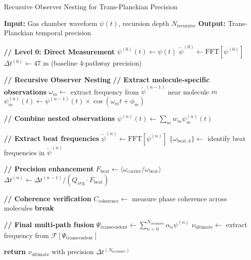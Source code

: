 \documentclass[12pt,a4paper]{article}
\begin{document}
\begin{algorithm}[H]
\caption{Recursive Observer Nesting for Trans-Planckian Precision}
\begin{algorithmic}[1]
\State \textbf{Input:} Gas chamber waveform $\psi(t)$, recursion depth $N_{\text{recursive}}$
\State \textbf{Output:} Trans-Planckian temporal precision

\State \textbf{// Level 0: Direct Measurement}
\State $\psi^{(0)}(t) \gets \psi(t)$
\State $\tilde{\psi}^{(0)} \gets \text{FFT}[\psi^{(0)}]$
\State $\Delta t^{(0)} \gets 47$ zs (baseline 4-pathway precision)

\State \textbf{// Recursive Observer Nesting}
    \State \textbf{// Extract molecule-specific observations}
        \State $\omega_m \gets$ extract frequency from $\tilde{\psi}^{(n-1)}$ near molecule $m$
        \State $\psi_m^{(n)}(t) \gets \psi^{(n-1)}(t) \times \cos(\omega_m t + \phi_m)$
    \EndFor

    \State \textbf{// Combine nested observations}
    \State $\psi^{(n)}(t) \gets \sum_m w_m \psi_m^{(n)}(t)$ 

    \State \textbf{// Extract beat frequencies}
    \State $\tilde{\psi}^{(n)} \gets \text{FFT}[\psi^{(n)}]$
    \State $\{\omega_{\text{beat},k}\} \gets$ identify beat frequencies in $\tilde{\psi}^{(n)}$

    \State \textbf{// Precision enhancement}
    \State $F_{\text{beat}} \gets \langle\omega_{\text{carrier}}/\omega_{\text{beat}}\rangle$ 
    \State $\Delta t^{(n)} \gets \Delta t^{(n-1)} / (Q_{\text{avg}} \cdot F_{\text{beat}})$

    \State \textbf{// Coherence verification}
    \State $C_{\text{coherence}} \gets$ measure phase coherence across molecules
        \State \textbf{break} 
    \EndIf
\EndFor

\State \textbf{// Final multi-path fusion}
\State $\Psi_{\text{transcendent}} \gets \sum_{n=0}^{N_{\text{recursive}}} \alpha_n \psi^{(n)}$
\State $\nu_{\text{ultimate}} \gets$ extract frequency from $\mathcal{F}[\Psi_{\text{transcendent}}]$

\State \textbf{return} $\nu_{\text{ultimate}}$ with precision $\Delta t^{(N_{\text{recursive}})}$
\end{algorithmic}
\end{algorithm}
\end{document}
